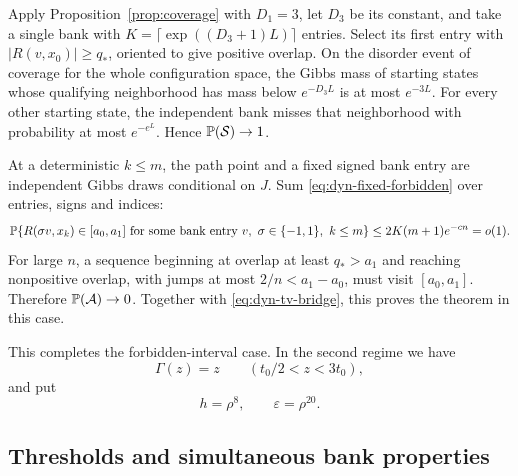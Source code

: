 Apply Proposition~\ref{prop:coverage} with $D_1=3$, let $D_3$ be its
constant, and take a single bank with
$K=\lceil\exp((D_3+1)L)\rceil$ entries. Select its first entry with
$|R(v,x_0)|\geq q_*$, oriented to give positive overlap. On the disorder
event of coverage for the whole configuration space, the Gibbs mass of
starting states whose qualifying neighborhood has mass below $e^{-D_3L}$
is at most $e^{-3L}$. For every other starting state, the independent bank
misses that neighborhood with probability at most $e^{-e^L}$. Hence
$\mathbb P(\mathcal S)\to1$.

At a deterministic $k\le m$, the path point and a fixed signed bank
entry are independent Gibbs draws conditional on $J$. Sum
\eqref{eq:dyn-fixed-forbidden} over entries, signs and indices:
\[
 \mathbb P\{R(\sigma v,x_k)\in[a_0,a_1]
     \text{ for some bank entry }v,\ \sigma\in\{-1,1\},\ k\leq m\}
 \leq 2K(m+1)e^{-cn}=o(1).
\]
For large $n$, a sequence beginning at overlap at least $q_*>a_1$ and
reaching nonpositive overlap, with jumps at most $2/n<a_1-a_0$, must visit
$[a_0,a_1]$. Therefore $\mathbb P(\mathcal A)\to0$. Together with
\eqref{eq:dyn-tv-bridge}, this proves the theorem in this case.

This completes the forbidden-interval case. In the second regime we have
\begin{equation}\label{eq:dyn-identity-interval}
 \Gamma(z)=z\qquad(t_0/2<z<3t_0),
\end{equation}
and put
\begin{equation}\label{eq:dyn-local-scales}
 h=\rho^8,\qquad \varepsilon=\rho^{20}.
\end{equation}

\subsection{Thresholds and simultaneous bank properties}

